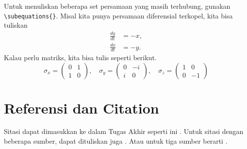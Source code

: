 Untuk menuliskan beberapa set persamaan yang masih terhubung, gunakan \verb|\subequations{}|. Misal kita punya persamaan diferensial terkopel, kita bisa tuliskan
\begin{subequations}
        \begin{align}
                \frac{dy}{dt} & = -x , \\
                \frac{dx}{dt} & = -y .
        \end{align}
\end{subequations}
Kalau perlu matriks, kita bisa tulis seperti berikut.
\begin{equation}
        \sigma_x = \begin{pmatrix}
                0 & 1 \\
                1 & 0
        \end{pmatrix},\quad
        \sigma_y = \begin{pmatrix}
                0 & -i \\
                i & 0
        \end{pmatrix}, \quad
        \sigma_z = \begin{pmatrix}
                1 & 0  \\
                0 & -1
        \end{pmatrix}
\end{equation}


\section{Referensi dan Citation}
\noindent Sitasi dapat dimasukkan ke dalam Tugas Akhir seperti ini \cite{Fujita1996}. Untuk sitasi dengan beberapa sumber, dapat dituliskan juga \cite{hohen1964,Kim2006}. Atau untuk tiga sumber berarti \cite{kongkanand2006,kresse1999,Leibb1993}.

